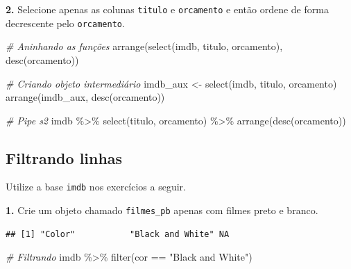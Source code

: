 \documentclass[
]{book}
\newenvironment{Shaded}{\begin{snugshade}}{\end{snugshade}}
\newcommand{\CommentTok}[1]{\textcolor[rgb]{0.56,0.35,0.01}{\textit{#1}}}
\newcommand{\FunctionTok}[1]{\textcolor[rgb]{0.00,0.00,0.00}{#1}}
\newcommand{\NormalTok}[1]{#1}
\newcommand{\OtherTok}[1]{\textcolor[rgb]{0.56,0.35,0.01}{#1}}
\newcommand{\SpecialCharTok}[1]{\textcolor[rgb]{0.00,0.00,0.00}{#1}}
\newcommand{\StringTok}[1]{\textcolor[rgb]{0.31,0.60,0.02}{#1}}
\begin{document}
\textbf{2.} Selecione apenas as colunas \texttt{titulo} e \texttt{orcamento} e então ordene de forma decrescente pelo \texttt{orcamento}.

\begin{Shaded}
\begin{Highlighting}[]
\CommentTok{\# Aninhando as funções}
\FunctionTok{arrange}\NormalTok{(}\FunctionTok{select}\NormalTok{(imdb, titulo, orcamento), }\FunctionTok{desc}\NormalTok{(orcamento))}

\CommentTok{\# Criando objeto intermediário}
\NormalTok{imdb\_aux }\OtherTok{\textless{}{-}} \FunctionTok{select}\NormalTok{(imdb, titulo, orcamento)}
\FunctionTok{arrange}\NormalTok{(imdb\_aux, }\FunctionTok{desc}\NormalTok{(orcamento))}

\CommentTok{\# Pipe s2}
\NormalTok{imdb }\SpecialCharTok{\%\textgreater{}\%} 
  \FunctionTok{select}\NormalTok{(titulo, orcamento) }\SpecialCharTok{\%\textgreater{}\%} 
  \FunctionTok{arrange}\NormalTok{(}\FunctionTok{desc}\NormalTok{(orcamento))}
\end{Highlighting}
\end{Shaded}

\hypertarget{filtrando-linhas-1}{%
\subsection*{Filtrando linhas}\label{filtrando-linhas-1}}

Utilize a base \texttt{imdb} nos exercícios a seguir.

\textbf{1.} Crie um objeto chamado \texttt{filmes\_pb} apenas com filmes preto e branco.

\begin{Shaded}
\end{Shaded}

\begin{verbatim}
## [1] "Color"           "Black and White" NA
\end{verbatim}

\begin{Shaded}
\begin{Highlighting}[]
\CommentTok{\# Filtrando}
\NormalTok{imdb }\SpecialCharTok{\%\textgreater{}\%} \FunctionTok{filter}\NormalTok{(cor }\SpecialCharTok{==} \StringTok{"Black and White"}\NormalTok{)}
\end{Highlighting}
\end{Shaded}
\end{document}
